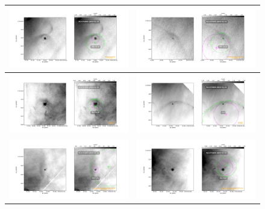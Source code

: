 \begin{figure}[htp]
\centering
\begin{tabular}{|l|l|}
\hline
    \includegraphics[width=0.47\linewidth,  trim=60 50 100 50, clip]{j8oc08010_wcs/308-3036-Bally_08-images.pdf}
    &\includegraphics[width=0.47\linewidth,  trim=60 50 100 50, clip]{j8oc08010_wcs/344-3020-Bally_08-images.pdf}\\ \hline
    \includegraphics[width=0.47\linewidth,  trim=60 50 100 50, clip]{j8oc08010_wcs/362-3137-Bally_08-images.pdf}
    &\includegraphics[width=0.47\linewidth,  trim=60 50 100 50, clip]{j8oc08010_wcs/LL6-Bally_08-images.pdf}\\ \hline
    \includegraphics[width=0.47\linewidth,  trim=60 50 100 50, clip]{j8oc09010_wcs/049-143-Bally_09-images.pdf}
    &\includegraphics[width=0.47\linewidth,  trim=60 50 100 50, clip]{j8oc09010_wcs/051-024-Bally_09-images.pdf}\\ \hline

\end{tabular}
\end{figure}
